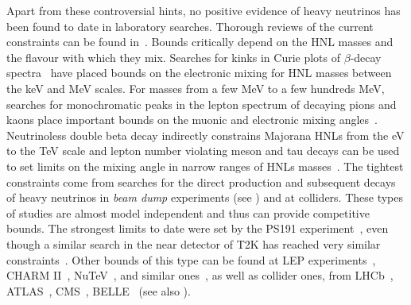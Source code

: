 Apart from these controversial hints, no positive evidence of heavy neutrinos has been found to date in laboratory searches.
Thorough reviews of the current constraints can be found in~. 
Bounds critically depend on the HNL masses and the flavour with which they mix.
Searches for kinks in Curie plots of $\beta$-decay spectra~\cite{Galeazzi:2001py, Hiddemann:1995ce, Holzschuh:1999vy, %
Holzschuh:2000nj, Deutsch:1990ut} have placed bounds on the electronic mixing for HNL masses between the keV and MeV scales.  
%
For masses from a few MeV to a few hundreds MeV, searches for monochromatic peaks %
in the lepton spectrum of decaying pions and kaons place important bounds on the muonic and %
electronic mixing angles~\cite{Artamonov:2014urb, Britton:1992pg, Britton:1992xv, Aguilar-Arevalo:2017vlf, Aguilar-Arevalo:2019owf}.
Neutrinoless double beta decay indirectly constrains Majorana HNLs from the eV to the TeV scale %
and lepton number violating meson and tau decays can be used to set limits on the mixing angle %
in narrow ranges of HNLs masses~\cite{Atre:2009rg}. 
%
%
The tightest constraints come from searches for the direct production and subsequent decays of heavy neutrinos %
in \emph{beam dump} experiments (see ) and at colliders.
These types of studies are almost model independent and thus can provide competitive bounds. 
The strongest limits to date were set by the PS191 experiment~\cite{Bernardi:1985ny, Bernardi:1987ek}, %
even though a similar search in the near detector of T2K has reached very similar constraints~\cite{Abe:2019kgx}.
Other bounds of this type can be found at LEP experiments~\cite{Abreu:1996pa, Adriani:1992pq}, CHARM II~\cite{Vilain:1994vg}, %
NuTeV~\cite{Vaitaitis:1999wq}, and similar ones~\cite{Badier:1985wg, CooperSarkar:1985nh, Gallas:1994xp}, %
as well as collider ones, from LHCb~\cite{Aaij:2014aba}, ATLAS~\cite{Aaboud:2018spl}, CMS~\cite{Sirunyan:2018mtv, Sirunyan:2018xiv}, %
BELLE~\cite{Liventsev:2013zz} (see also ).

